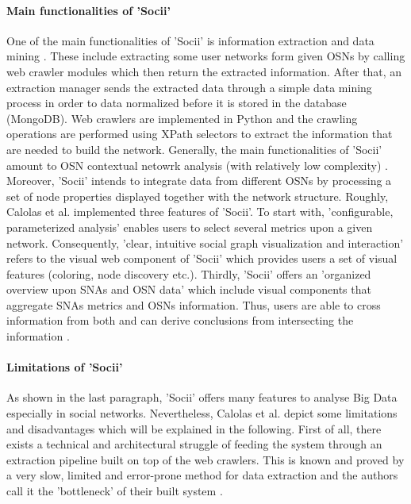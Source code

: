 \paragraph{Main functionalities of 'Socii'}

One of the main functionalities of 'Socii' is information extraction and data mining \cite[p.223]{trends_nosql}. These include extracting some user networks form given OSNs by calling web crawler modules which then return the extracted information. After that, an extraction manager sends the extracted data through a simple data mining process in order to data normalized before it is stored in the database (MongoDB). Web crawlers are implemented in Python and the crawling operations are performed using XPath selectors to extract the information that are needed to build the network.
Generally, the main functionalities of 'Socii' amount to OSN contextual netowrk analysis (with relatively low complexity) \cite[p.227]{trends_nosql}. Moreover, 'Socii' intends to integrate data from different OSNs by processing a set of node properties displayed together with the network structure. Roughly, Calolas et al. implemented three features of 'Socii'. To start with, 'configurable, parameterized analysis' enables users to select several metrics upon a given network. Consequently, 'clear, intuitive social graph visualization and interaction' refers to the visual web component of 'Socii' which provides users a set of visual features (coloring, node discovery etc.). Thirdly, 'Socii' offers an 'organized overview upon SNAs and OSN data' which include visual components that aggregate SNAs metrics and OSNs information. Thus, users are able to cross information from both and can derive conclusions from intersecting the information \cite{trends_nosql}. 

\paragraph{Limitations of 'Socii'}

As shown in the last paragraph, 'Socii' offers many features to analyse Big Data especially in social networks. Nevertheless, Calolas et al. depict some limitations and disadvantages which will be explained in the following. 
First of all, there exists a technical and architectural struggle of feeding the system through an extraction pipeline built on top of the web crawlers. This is known and proved by a very slow, limited and error-prone method for data extraction and the authors call it the 'bottleneck' of their built system \cite [p.227]{trends_nosql}. 

